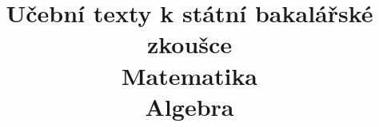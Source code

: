 \clearpage

\clearpage

\title{\LARGE Učební texty k státní bakalářské zkoušce \\ Matematika \\ Algebra}



\maketitle

\newpage
\setcounter{section}{7}



